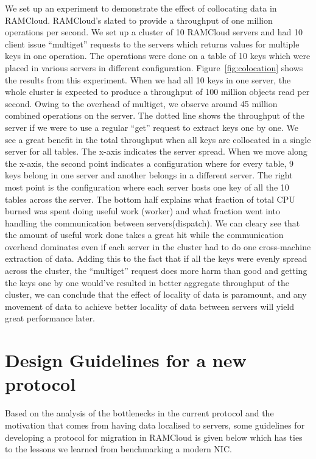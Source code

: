 We set up an experiment to demonstrate the effect of collocating data in RAMCloud. RAMCloud's slated to provide a throughput of one million operations per second. We set up a cluster of 10 RAMCloud servers 
and had 10 client issue ``multiget'' requests to the servers which returns values for multiple keys in one operation. The operations were done on a table of 10 keys which were placed in various servers in different 
configuration. Figure~\ref{fig:colocation} shows the results from this experiment. When we had all 10 keys in one server, the whole cluster is expected to produce a throughput of 100 million objects read per second.
Owing to the overhead of multiget, we observe around 45 million combined operations on the server. The dotted line shows the throughput of the server if we were to use a regular ``get'' request to extract keys one by one.
We see a great benefit in the total throughput when all keys are collocated in a single server for all tables. The x-axis indicates the server spread. When we move along the x-axis, the second point indicates a configuration where for every table, 9 keys belong in one server and 
another belongs in a different server. The right most point is the configuration where each server hosts one key of all the 10 tables across the server. The bottom half explains what fraction of total CPU burned was spent 
doing useful work (worker) and what fraction went into handling the communication between servers(dispatch). We can cleary see that the amount of useful work done takes a great hit while the communication overhead dominates 
even if each server in the cluster had to do one cross-machine extraction of data. Adding this to the fact that if all the keys were evenly spread across the cluster, the ``multiget'' request does more harm than good and getting the 
keys one by one would've resulted in better aggregate throughput of the cluster, we can conclude that the effect of locality of data is paramount, and any movement of data to achieve better locality of data between servers will yield 
great performance later.


\section{Design Guidelines for a new protocol}
Based on the analysis of the bottlenecks in the current protocol and the motivation that comes from having data localised to servers, some guidelines for developing a protocol for migration in RAMCloud
is given below which has ties to the lessons we learned from benchmarking a modern NIC.

